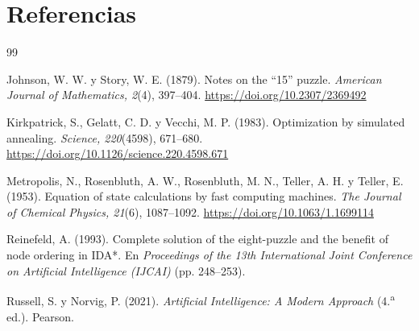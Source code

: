 \documentclass[12pt,a4paper]{article}
\begin{document}
\newpage
\section*{Referencias}

\begin{thebibliography}{99}

Johnson, W. W. y Story, W. E. (1879). Notes on the ``15'' puzzle.
\textit{American Journal of Mathematics, 2}(4), 397--404.
\url{https://doi.org/10.2307/2369492}

Kirkpatrick, S., Gelatt, C. D. y Vecchi, M. P. (1983). Optimization by
simulated annealing. \textit{Science, 220}(4598), 671--680.
\url{https://doi.org/10.1126/science.220.4598.671}

Metropolis, N., Rosenbluth, A. W., Rosenbluth, M. N., Teller, A. H. y
Teller, E. (1953). Equation of state calculations by fast computing
machines. \textit{The Journal of Chemical Physics, 21}(6), 1087--1092.
\url{https://doi.org/10.1063/1.1699114}

Reinefeld, A. (1993). Complete solution of the eight-puzzle and the
benefit of node ordering in IDA*. En \textit{Proceedings of the 13th
International Joint Conference on Artificial Intelligence (IJCAI)}
(pp. 248--253).

Russell, S. y Norvig, P. (2021). \textit{Artificial Intelligence: A
Modern Approach} (4.\textsuperscript{a} ed.). Pearson.

\end{thebibliography}
\end{document}

